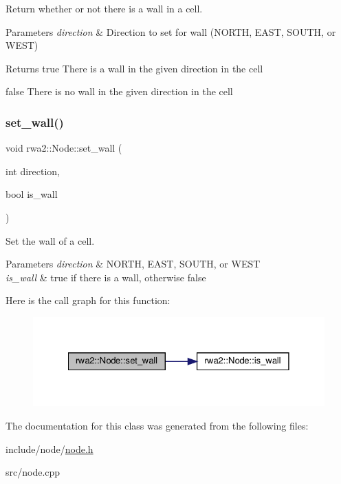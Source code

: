 Return whether or not there is a wall in a cell. 


\begin{DoxyParams}{Parameters}
{\em direction} & Direction to set for wall (N\+O\+R\+TH, E\+A\+ST, S\+O\+U\+TH, or W\+E\+ST) \\
\hline
\end{DoxyParams}
\begin{DoxyReturn}{Returns}
true There is a wall in the given direction in the cell 

false There is no wall in the given direction in the cell 
\end{DoxyReturn}
\mbox{\label{classrwa2_1_1_node_a9e887221d02616392f572dd4018b71ed}} 
\subsubsection{\texorpdfstring{set\+\_\+wall()}{set\_wall()}}
{\footnotesize\ttfamily void rwa2\+::\+Node\+::set\+\_\+wall (\begin{DoxyParamCaption}\item[{int}]{direction,  }\item[{bool}]{is\+\_\+wall }\end{DoxyParamCaption})}



Set the wall of a cell. 


\begin{DoxyParams}{Parameters}
{\em direction} & N\+O\+R\+TH, E\+A\+ST, S\+O\+U\+TH, or W\+E\+ST \\
\hline
{\em is\+\_\+wall} & true if there is a wall, otherwise false \\
\hline
\end{DoxyParams}
Here is the call graph for this function\+:
\nopagebreak
\begin{figure}[H]
\begin{center}
\leavevmode
\includegraphics[width=328pt]{classrwa2_1_1_node_a9e887221d02616392f572dd4018b71ed_cgraph}
\end{center}
\end{figure}


The documentation for this class was generated from the following files\+:\begin{DoxyCompactItemize}
\item 
include/node/\hyperlink{node_8h}{node.\+h}\item 
src/node.\+cpp\end{DoxyCompactItemize}
